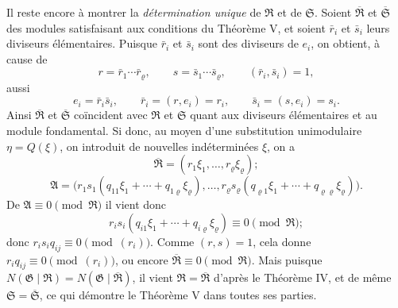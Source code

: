 \documentclass[11pt]{article}
\providecommand{\Amod}{\mathfrak A}
\providecommand{\Gmod}{\mathfrak G}
\providecommand{\Rmod}{\mathfrak R}
\providecommand{\Smod}{\mathfrak S}
\providecommand{\zero}[1]{\equiv 0\pmod{#1}}
\providecommand{\Norm}{N}
\begin{document}
Il reste encore à montrer la \emph{détermination unique} de $\Rmod$ et de $\Smod$. Soient $\overline{\Rmod}$ et $\overline{\Smod}$ des modules satisfaisant aux conditions du Théorème V, et soient $\bar r_i$ et $\bar s_i$ leurs diviseurs élémentaires. Puisque $\bar r_i$ et $\bar s_i$ sont des diviseurs de $e_i$, on obtient, à cause de
\[
 r=\bar r_1\cdots\bar r_\varrho,
 \qquad
 s=\bar s_1\cdots\bar s_\varrho,
 \qquad
 (\bar r_i,\bar s_i)=1,
\]
aussi
\[
 e_i=\bar r_i\bar s_i,
 \qquad
 \bar r_i=(r,e_i)=r_i,
 \qquad
 \bar s_i=(s,e_i)=s_i.
\]
Ainsi $\overline{\Rmod}$ et $\overline{\Smod}$ coïncident avec $\Rmod$ et $\Smod$ quant aux diviseurs élémentaires et au module fondamental. Si donc, au moyen d'une substitution unimodulaire $\eta=Q(\xi)$, on introduit de nouvelles indéterminées $\xi$, on a
\[
 \overline{\Rmod}=(r_1\xi_1,\ldots,r_\varrho\xi_\varrho);
\]
\[
 \Amod=\bigl(r_1s_1(q_{11}\xi_1+\cdots+q_{1\varrho}\xi_\varrho),\ldots,
 r_\varrho s_\varrho(q_{\varrho1}\xi_1+\cdots+q_{\varrho\varrho}\xi_\varrho)\bigr).
\]
De $\Amod\zero{\Rmod}$ il vient donc
\[
 r_i s_i(q_{i1}\xi_1+\cdots+q_{i\varrho}\xi_\varrho)\zero{\Rmod};
\]
donc $r_is_iq_{ij}\zero{(r_i)}$. Comme $(r,s)=1$, cela donne $r_iq_{ij}\zero{(r_i)}$, ou encore $\overline{\Rmod}\zero{\Rmod}$. Mais puisque $\Norm(\Gmod\mid\Rmod)=\Norm(\Gmod\mid\overline{\Rmod})$, il vient $\Rmod=\overline{\Rmod}$ d'après le Théorème IV, et de même $\Smod=\overline{\Smod}$, ce qui démontre le Théorème V dans toutes ses parties.

\clearpage
\ifdefined\NoetherPaperTwentyTwoSTwoBodyOnly
\else
\end{document}
